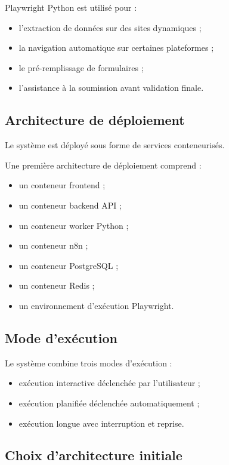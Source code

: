 \documentclass[11pt,a4paper]{article}
\begin{document}
Playwright Python est utilisé pour :

\begin{itemize}
    \item l’extraction de données sur des sites dynamiques ;
    \item la navigation automatique sur certaines plateformes ;
    \item le pré-remplissage de formulaires ;
    \item l’assistance à la soumission avant validation finale.
\end{itemize}

\subsection{Architecture de déploiement}

Le système est déployé sous forme de services conteneurisés.

Une première architecture de déploiement comprend :

\begin{itemize}
    \item un conteneur frontend ;
    \item un conteneur backend API ;
    \item un conteneur worker Python ;
    \item un conteneur n8n ;
    \item un conteneur PostgreSQL ;
    \item un conteneur Redis ;
    \item un environnement d’exécution Playwright.
\end{itemize}

\subsection{Mode d’exécution}

Le système combine trois modes d’exécution :

\begin{itemize}
    \item exécution interactive déclenchée par l’utilisateur ;
    \item exécution planifiée déclenchée automatiquement ;
    \item exécution longue avec interruption et reprise.
\end{itemize}

\subsection{Choix d’architecture initiale}
\end{document}
